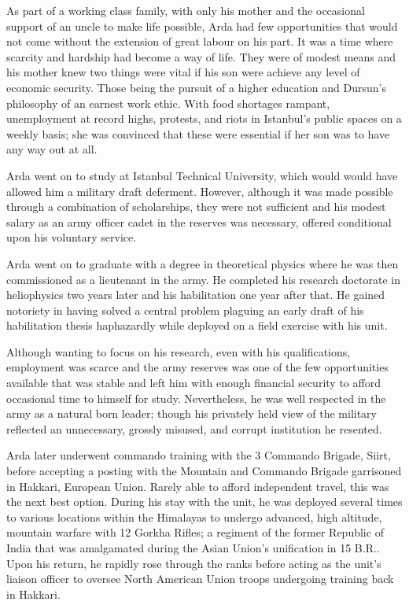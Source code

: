 As part of a working class family, with only his mother and the occasional support of an uncle to make life possible, Arda had few opportunities that would not come without the extension of great labour on his part. It was a time where scarcity and hardship had become a way of life. They were of modest means and his mother knew two things were vital if his son were achieve any level of economic security. Those being the pursuit of a higher education and Dursun's philosophy of an earnest work ethic. With food shortages rampant, unemployment at record highs, protests, and riots in Istanbul's public spaces on a weekly basis; she was convinced that these were essential if her son was to have any way out at all.

Arda went on to study at Istanbul Technical University, which would would have allowed him a military draft deferment. However, although it was made possible through a combination of scholarships, they were not sufficient and his modest salary as an army officer cadet in the reserves was necessary, offered conditional upon his voluntary service. 

Arda went on to graduate with a degree in theoretical physics where he was then commissioned as a lieutenant in the army. He completed his research doctorate in heliophysics two years later and his habilitation one year after that. He gained notoriety in having solved a central problem plaguing an early draft of his habilitation thesis haphazardly while deployed on a field exercise with his unit.

Although wanting to focus on his research, even with his qualifications, employment was scarce and the army reserves was one of the few opportunities available that was stable and left him with enough financial security to afford occasional time to himself for study. Nevertheless, he was well respected in the army as a natural born leader; though his privately held view of the military reflected an unnecessary, grossly misused, and corrupt institution he resented.

Arda later underwent commando training with the 3 Commando Brigade, Siirt, before accepting a posting with the Mountain and Commando Brigade garrisoned in Hakkari, European Union. Rarely able to afford independent travel, this was the next best option. During his stay with the unit, he was deployed several times to various locations within the Himalayas to undergo advanced, high altitude, mountain warfare with 12 Gorkha Rifles; a regiment of the former Republic of India that was amalgamated during the Asian Union's unification in 15 B.R.. Upon his return, he rapidly rose through the ranks before acting as the unit's liaison officer to oversee North American Union troops undergoing training back in Hakkari.

